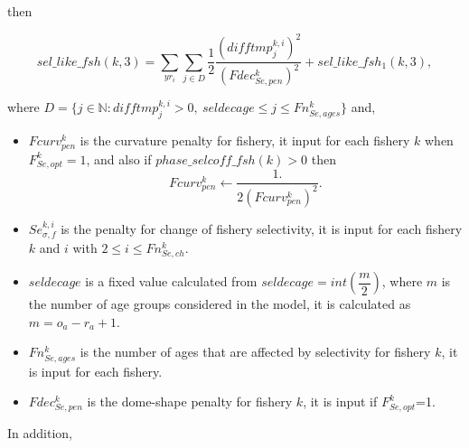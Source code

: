 \documentclass{article}
\begin{document}
\begin{itemize}
then

\begin{equation}
    sel\_like\_fsh(k,3)    = \sum_{yr_i}\sum_{j\in D}\dfrac{1}{2}\dfrac{( difftmp_j^{k,i} )^2}{(Fdec_{Se,pen}^k)^2}+sel\_like\_fsh_1(k,3),
\end{equation}

where $D=\{j \in \mathbb{N} : difftmp_j^{k,i}>0, \ seldecage \leq j \leq Fn_{Se,ages}^k\}$ and,
\begin{itemize}
    \item $Fcurv_{pen}^k$ is the curvature penalty for fishery, it input for each fishery $k$ when $F^k_{Se,opt}=1$,  and also
        if $phase\_selcoff\_fsh(k)>0$ then
        \begin{equation*}
    Fcurv_{pen}^k \leftarrow \dfrac{1.} {2{(Fcurv_{pen}^k)}^2}.\end{equation*} 
    \item $Se_{\sigma,f}^{k,i}$ is the penalty for change of fishery selectivity, it is input for each fishery $k$ and $i$ with  $2\leq i \leq Fn_{Se,ch}^k$.
    \item $seldecage$ is a fixed value calculated from $seldecage=int\left(\dfrac{m}{2}\right)$, where $m$ is the number of age groups considered in the model, it is calculated as $m = o_a-r_a+1$.
    \item $Fn_{Se,ages}^k$ is the number of ages that are affected by selectivity for fishery $k$, it is input for each fishery.
    \item $Fdec_{Se,pen}^k$ is the dome-shape penalty for fishery $k$, it is input if $F_{Se,opt}^k$=1.
    
\end{itemize}

\end{itemize}
In addition,
\end{document}
